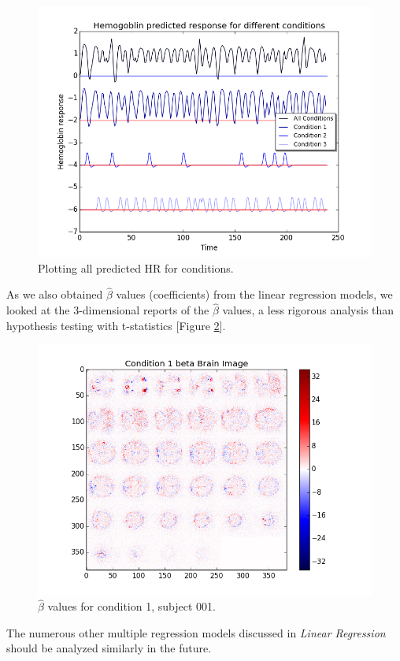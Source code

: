 \begin{figure}[ht]
\centering
\includegraphics[scale=.5]{images/all_cond_time}  
\caption{Plotting all predicted HR for conditions.}
\label{fig:all_cond_time}
\end{figure}

As we also obtained $\hat{\beta}$ values (coefficients) from the linear 
regression models, we looked at the 3-dimensional reports of the 
$\hat{\beta}$ values, a less rigorous analysis than hypothesis testing with 
t-statistics [Figure \ref{fig:con1_beta_brain}]. 

\begin{figure}[ht]
\centering
\includegraphics[scale=.5]{images/mr_cond1_beta_brain}    
\caption{$\hat{\beta}$ values for condition 1, subject 001.}
\label{fig:con1_beta_brain}
\end{figure}

The numerous other multiple regression models discussed in 
\textit{Linear Regression} should be analyzed similarly in the future. 
